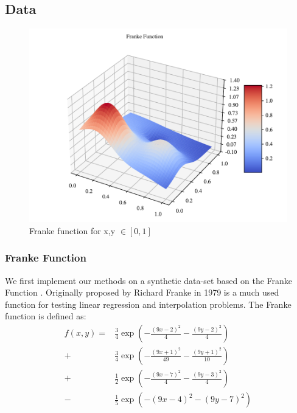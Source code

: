 \subsection{Data}

\begin{figure}[h!]
\centering
\includegraphics[width=1\linewidth]{project_1_alt/figures/data/franke_func.pdf}
\caption{Franke function for x,y $\in [0,1]$}
\label{franke}
\end{figure}
\subsubsection{Franke Function}
We first implement our methods on a synthetic data-set based on the Franke Function \citep[p. 13]{frank}. Originally proposed by Richard Franke in 1979 is a much used function for testing linear regression and interpolation problems.
The Franke function is defined as:
\begin{align}
    f(x, y) = &\frac{3}{4} \exp\left( -\frac{(9x - 2)^2}{4} - \frac{(9y - 2)^2}{4} \right) \nonumber \\
    + &\frac{3}{4} \exp\left( -\frac{(9x + 1)^2}{49} - \frac{(9y + 1)^2}{10} \right) \nonumber \\
    + &\frac{1}{2} \exp\left( -\frac{(9x - 7)^2}{4} - \frac{(9y - 3)^2}{4} \right) \nonumber \\
    - &\frac{1}{5} \exp\left( -(9x - 4)^2 - (9y - 7)^2 \right)
\end{align}




